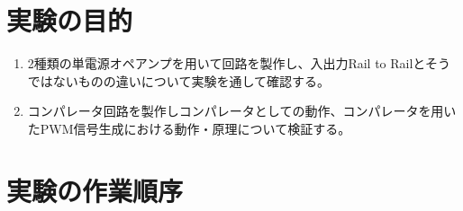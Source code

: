 \documentclass[a4paper,11pt,xelatex,ja=standard]{bxjsarticle}
\begin{document}
\section{実験の目的}

    \begin{enumerate}
        \item 2種類の単電源オペアンプを用いて回路を製作し、入出力Rail to Railとそうではないものの違いについて実験を通して確認する。
        \item コンパレータ回路を製作しコンパレータとしての動作、コンパレータを用いたPWM信号生成における動作・原理について検証する。
    \end{enumerate}

\section{実験の作業順序}
\end{document}
